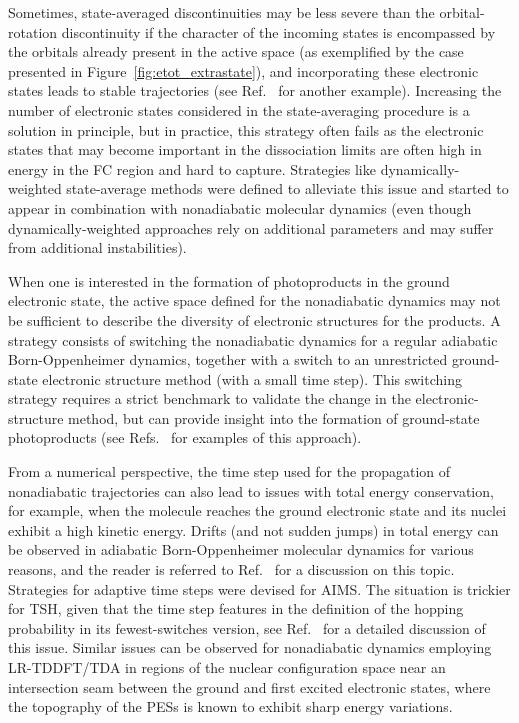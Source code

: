 \documentclass[9pt,bestpractices,pubversion]{livecoms}
\begin{document}
Sometimes, state-averaged discontinuities may be less severe than the orbital-rotation discontinuity if the character of the incoming states is encompassed by the orbitals already present in the active space (as exemplified by the case presented in Figure~\ref{fig:etot_extrastate}), and incorporating these electronic states leads to stable trajectories (see Ref.~ for another example). Increasing the number of electronic states considered in the state-averaging procedure is a solution in principle, but in practice, this strategy often fails as the electronic states that may become important in the dissociation limits are often high in energy in the FC region and hard to capture. Strategies like dynamically-weighted state-average methods were defined to alleviate this issue\cite{glover2019analytical,battaglia2020extended,li2019dynamically} and started to appear in combination with nonadiabatic molecular dynamics (even though dynamically-weighted approaches rely on additional parameters and may suffer from additional instabilities).\cite{ibele2024aimspt2}

When one is interested in the formation of photoproducts in the ground electronic state, the active space defined for the nonadiabatic dynamics may not be sufficient to describe the diversity of electronic structures for the products. A strategy consists of switching the nonadiabatic dynamics for a regular adiabatic Born-Oppenheimer dynamics, together with a switch to an unrestricted ground-state electronic structure method (with a small time step). This switching strategy requires a strict benchmark to validate the change in the electronic-structure method, but can provide insight into the formation of ground-state photoproducts (see Refs.~ for examples of this approach). 

From a numerical perspective, the time step used for the propagation of nonadiabatic trajectories can also lead to issues with total energy conservation, for example, when the molecule reaches the ground electronic state and its nuclei exhibit a high kinetic energy. Drifts (and not sudden jumps) in total energy can be observed in adiabatic Born-Oppenheimer molecular dynamics for various reasons, and the reader is referred to Ref.~ for a discussion on this topic. Strategies for adaptive time steps were devised for AIMS.\cite{levine2008implementation} The situation is trickier for TSH, given that the time step features in the definition of the hopping probability in its fewest-switches version, see Ref.~ for a detailed discussion of this issue. Similar issues can be observed for nonadiabatic dynamics employing LR-TDDFT/TDA in regions of the nuclear configuration space near an intersection seam between the ground and first excited electronic states, where the topography of the PESs is known to exhibit sharp energy variations.\cite{levine06,tapavicza08,tavernelli09b,taylor2023description} 
\end{document}
